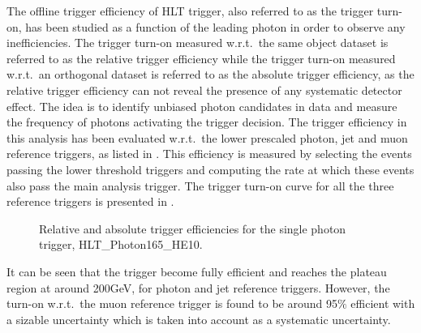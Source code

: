 The offline trigger efficiency of HLT trigger, also referred to as the trigger turn-on, has been studied as a function of the leading photon \pt in order to
observe any inefficiencies. The trigger turn-on measured w.r.t.\ the same object dataset is referred to as the relative trigger efficiency while
the trigger turn-on measured w.r.t.\ an orthogonal dataset is referred to as the absolute trigger efficiency, as the relative trigger efficiency can not reveal the
presence of any systematic detector effect. The idea is to identify unbiased photon candidates in data and measure the frequency of photons activating
the trigger decision. The trigger efficiency in this analysis has been evaluated w.r.t.\ the lower \pt prescaled photon, jet and muon reference triggers, as listed
in \tab{\ref{Table:trigturnon}}. This efficiency is measured by selecting the events passing the lower \pt threshold triggers and computing the rate at which
these events also pass the main analysis trigger. The trigger turn-on curve for all the three reference triggers is presented in \fig{\ref{fig:TrigTurnOn}}.

\vspace{0.12in}


\vspace{-0.2in}
\begin{figure}[h!]
\centering
 \caption{Relative and absolute trigger efficiencies for the single photon trigger, HLT\_Photon165\_HE10.}
 \label{fig:TrigTurnOn}
\end{figure}

It can be seen that the trigger become fully efficient and reaches the plateau region at around 200\unit{GeV}, for photon and jet reference triggers.
However, the turn-on w.r.t.\ the muon reference trigger is found to be around 95$\%$ efficient with
a sizable uncertainty which is taken into account as a systematic uncertainty.


